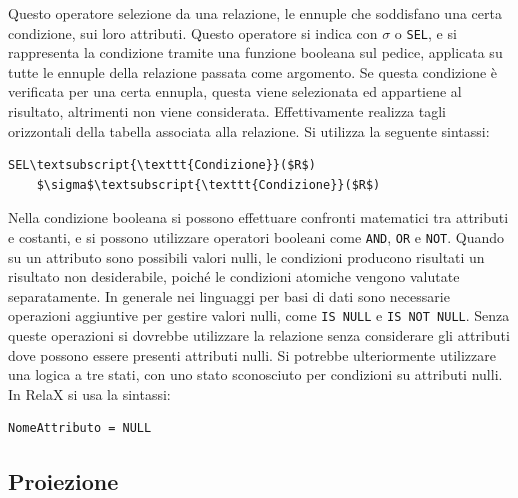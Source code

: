 \documentclass{article}
\numberwithin{equation}{subsection}
\begin{document}
Questo operatore selezione da una relazione, le ennuple che soddisfano una certa condizione, sui loro attributi. Questo operatore si indica con $\sigma$ o \verb|SEL|, e si rappresenta la condizione tramite una funzione 
booleana sul pedice, applicata su tutte le ennuple della relazione passata come argomento. Se questa condizione è verificata per una certa ennupla, questa viene selezionata ed appartiene al risultato, altrimenti non 
viene considerata. 
Effettivamente realizza tagli orizzontali della tabella associata alla relazione. Si utilizza la seguente sintassi:
\begin{Verbatim}[commandchars=\\\{\}, codes={\catcode`$=3\catcode`_=8}]
    SEL\textsubscript{\texttt{Condizione}}($R$)
    $\sigma$\textsubscript{\texttt{Condizione}}($R$)
\end{Verbatim}
Nella condizione booleana si possono effettuare confronti matematici tra attributi e costanti, e si possono utilizzare operatori booleani come \verb|AND|, \verb|OR| e \verb|NOT|. 
Quando su un attributo sono possibili valori nulli, le condizioni producono risultati un risultato non desiderabile, poiché le condizioni atomiche vengono valutate separatamente. In generale nei linguaggi per basi 
di dati sono necessarie operazioni aggiuntive per gestire valori nulli, come \verb|IS NULL| e \verb|IS NOT NULL|. Senza queste operazioni si dovrebbe utilizzare la relazione senza considerare gli attributi dove possono essere 
presenti attributi nulli. 
Si potrebbe ulteriormente utilizzare una logica a tre stati, con uno stato sconosciuto per condizioni su attributi nulli. In RelaX si usa la sintassi:
\begin{Verbatim}[commandchars=\\\{\}, codes={\catcode`$=3\catcode`_=8}]
    NomeAttributo = NULL
\end{Verbatim}
\subsection{Proiezione}
\end{document}
